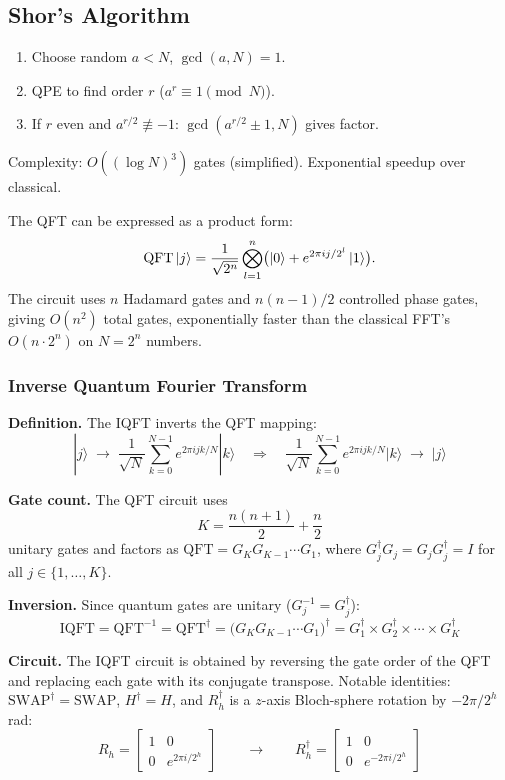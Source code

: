 \documentclass[10pt,a4paper]{article}
\begin{document}
\subsection{Shor's Algorithm}

\begin{tcolorbox}[algostyle, title={Algorithm}]
\begin{enumerate}[nosep]
\item Choose random $a<N$, $\gcd(a,N)=1$.
\item QPE to find order $r$ ($a^r\equiv 1\pmod{N}$).
\item If $r$ even and $a^{r/2}\not\equiv -1$: $\gcd(a^{r/2}\pm 1,N)$ gives factor.
\end{enumerate}
Complexity: $O((\log N)^3)$ gates (simplified). Exponential speedup over classical.
\end{tcolorbox}

The QFT can be expressed as a product form:
\[
\mathrm{QFT}\ket{j}=\frac{1}{\sqrt{2^n}}\bigotimes_{l=1}^{n}\bigl(\ket{0}+e^{2\pi ij/2^l}\ket{1}\bigr).
\]
The circuit uses $n$ Hadamard gates and $n(n-1)/2$ controlled phase gates, giving $O(n^2)$ total gates, exponentially faster than the classical FFT's $O(n\cdot 2^n)$ on $N=2^n$ numbers.

\subsubsection*{Inverse Quantum Fourier Transform}

\textbf{Definition.} The IQFT inverts the QFT mapping:
\[
  |j\rangle \;\rightarrow\; \frac{1}{\sqrt{N}}\sum_{k=0}^{N-1}e^{2\pi ijk/N}|k\rangle
  \quad\Longrightarrow\quad
  \frac{1}{\sqrt{N}}\sum_{k=0}^{N-1}e^{2\pi ijk/N}|k\rangle \;\rightarrow\; |j\rangle
\]

\textbf{Gate count.} The QFT circuit uses
\[
  K = \frac{n(n+1)}{2} + \frac{n}{2}
\]
unitary gates and factors as $\mathrm{QFT} = G_K G_{K-1}\cdots G_1$,
where $G_j^\dagger G_j = G_j G_j^\dagger = I$ for all $j\in\{1,\dots,K\}$.

\textbf{Inversion.} Since quantum gates are unitary ($G_j^{-1}=G_j^\dagger$):
\[
  \mathrm{IQFT} = \mathrm{QFT}^{-1} = \mathrm{QFT}^\dagger
  = \bigl(G_K G_{K-1}\cdots G_1\bigr)^\dagger
  = G_1^\dagger \times G_2^\dagger \times\cdots\times G_K^\dagger
\]

\textbf{Circuit.} The IQFT circuit is obtained by reversing the gate order
of the QFT and replacing each gate with its conjugate transpose.
Notable identities: $\mathrm{SWAP}^\dagger=\mathrm{SWAP}$, $H^\dagger=H$, and
$R_h^\dagger$ is a $z$-axis Bloch-sphere rotation by $-2\pi/2^h$ rad:
\[
  R_h = \begin{bmatrix} 1 & 0 \\ 0 & e^{2\pi i/2^h} \end{bmatrix}
  \qquad\longrightarrow\qquad
  R_h^\dagger = \begin{bmatrix} 1 & 0 \\ 0 & e^{-2\pi i/2^h} \end{bmatrix}
\]
\end{document}

